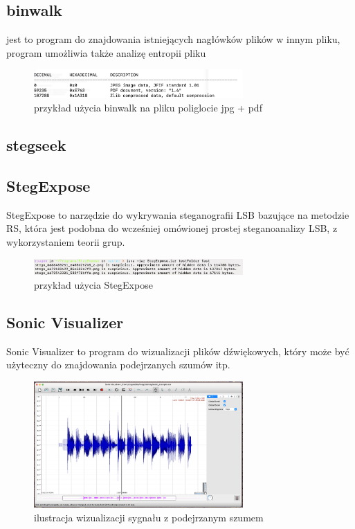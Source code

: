 \documentclass{article}
\begin{document}
\subsection{binwalk}
jest to program do znajdowania istniejących nagłówków plików w innym pliku, program umożliwia także analizę entropii pliku
\begin{figure}[H]
	\centering
	\includegraphics[width=8cm]{binwalk}
	\caption{przykład użycia binwalk na pliku poliglocie jpg + pdf}
\end{figure}
\subsection{stegseek} 
\subsection{StegExpose}
StegExpose to narzędzie do wykrywania steganografii LSB bazujące na metodzie RS,  która jest podobna
do wcześniej omówionej prostej steganoanalizy LSB, z wykorzystaniem teorii grup.
\begin{figure}[H]
	\centering
	\includegraphics[width=8cm]{stegexpose}
	\caption{przykład użycia StegExpose}
\end{figure}
\subsection{Sonic Visualizer}
Sonic Visualizer to program do wizualizacji plików dźwiękowych, który może być użyteczny do znajdowania
podejrzanych szumów itp.
\begin{figure}[H]
	\centering
	\includegraphics[width=8cm]{sonic}
	\caption{ilustracja wizualizacji sygnału z podejrzanym szumem}
\end{figure}
\end{document}
